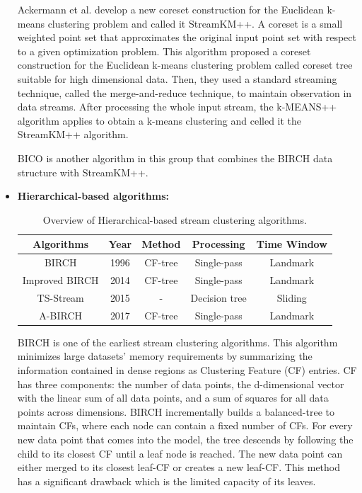\documentclass[../UNBThesis2.tex]{subfiles}
\begin{document}
\begin{itemize}
Ackermann et al. \cite{ackermann2012streamk} develop a new coreset construction for the Euclidean k-means clustering problem and called it StreamKM++. A coreset is a small weighted point set that approximates the original input point set with respect to a given optimization problem. This algorithm proposed a coreset construction for the Euclidean k-means clustering problem called coreset tree suitable for high dimensional data. Then, they used a standard streaming technique, called the merge-and-reduce technique, to maintain observation in data streams. After processing the whole input stream, the k-MEANS++ algorithm applies to obtain a k-means clustering and celled it the StreamKM++ algorithm.

BICO \cite{fichtenberger2013bico} is another algorithm in this group that combines the BIRCH data structure with StreamKM++. 






\item\textbf{Hierarchical-based algorithms:}

\begin{table}[h]
    \centering
    \caption{Overview of Hierarchical-based stream clustering algorithms. }
    \label{hirarcha}
    \small
    \begin{tabular}{c c c c c}
    \hline
      \textbf{Algorithms} & \textbf{Year} & \textbf{ Method } & \textbf{Processing} & \textbf{ Time Window}  \\
     \hline \midrule

      BIRCH             &    1996        &     CF-tree  &  Single-pass       & Landmark \\
     \hline
     Improved BIRCH     &    2014        &    CF-tree   &    Single-pass     & Landmark \\
      \hline
      TS-Stream         &     2015       &    -      &     Decision tree  & Sliding  \\
    \hline 
      A-BIRCH           &    2017        &   CF-tree    &   Single-pass      & Landmark\\
\bottomrule
    \end{tabular}
\end{table}

BIRCH \cite{zhang1996birch} is one of the earliest stream clustering algorithms. This algorithm minimizes large datasets' memory requirements by summarizing the information contained in dense regions as Clustering Feature (CF) entries. CF has three components: the number of data points, the d-dimensional vector with the linear sum of all data points, and a sum of squares for all data points across dimensions. BIRCH incrementally builds a balanced-tree to maintain CFs, where each node can contain a fixed number of CFs. 
For every new data point that comes into the model, the tree descends by following the child to its closest CF until a leaf node is reached. The new data point can either merged to its closest leaf-CF or creates a new leaf-CF. This method has a significant drawback which is the limited capacity of its leaves.


\end{itemize}
\end{document}
